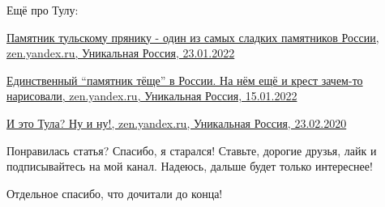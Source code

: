 Ещё про Тулу:

\href{https://zen.yandex.ru/media/id/5e52a45be977e25b8eec5de4/pamiatnik-tulskomu-prianiku-odin-iz-samyh-sladkih-pamiatnikov-rossii-61ed6a1c9a54d91fbe111182}{%
Памятник тульскому прянику - один из самых сладких памятников России, %
zen.yandex.ru, Уникальная Россия, 23.01.2022%
}

\href{https://zen.yandex.ru/media/id/5e52a45be977e25b8eec5de4/edinstvennyi-pamiatnik-tesce-v-rossii-na-nem-esce-i-krest-zachemto-narisovali-61e1d8dbc69d7367a14a1d98}{%
Единственный \enquote{памятник тёще} в России. На нём ещё и крест зачем-то нарисовали, %
zen.yandex.ru, Уникальная Россия, 15.01.2022%
}

\href{https://zen.yandex.ru/media/id/5e52a45be977e25b8eec5de4/i-eto-tula-nu-i-nu-5e52ae1f5c1f4e253331ed4e}{%
И это Тула? Ну и ну!, %
zen.yandex.ru, Уникальная Россия, 23.02.2020%
}

Понравилась статья? Спасибо, я старался! Ставьте, дорогие друзья, лайк и
подписывайтесь на мой канал. Надеюсь, дальше будет только интереснее!

Отдельное спасибо, что дочитали до конца!

